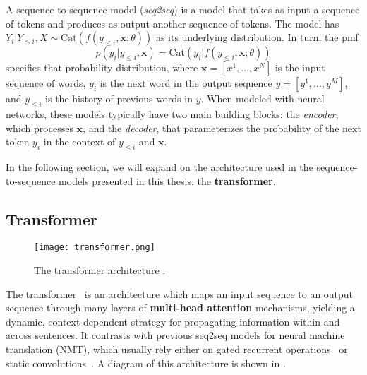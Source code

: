 \begin{definition}
    A sequence-to-sequence model (\textit{seq2seq}) is a model that takes as input a
    sequence of tokens and produces as output another sequence of tokens.
    The model has $Y_i | Y_{\leq i}, X \sim \text{Cat}(f(y_{\leq i}, \bm{x};
        \theta))$ as its underlying distribution. In turn, the pmf
    \begin{equation}
        p(y_i|y_{\leq i}, \bm{x}) = \text{Cat}(y_i|f(y_{\leq i}, \bm{x}; \theta))
    \end{equation}
    specifies that probability distribution, where
    $\bm{x}=[x^1, \dots, x^N]$ is the input sequence of words,
    $y_i$ is the next word in the output sequence $y=[y^1, \dots, y^M]$,
    and $y_{\leq i}$ is the history of previous words in $y$.
    When modeled with neural networks, these models typically have
    two main building blocks: the \textit{encoder}, which processes $\bm{x}$,
    and the \textit{decoder}, that parameterizes the probability of the next
    token $y_i$ in the context of $y_{\leq i}$ and $\bm{x}$.
\end{definition}

In the following section, we will expand on the architecture used in
the sequence-to-sequence models presented in this thesis: the \textbf{transformer}.

\subsection{Transformer}
\label{sec:transformer_bg}

\begin{figure}[t]
    \centering
    \texttt{[image: transformer.png]}
    \caption{The transformer architecture \citep[figure taken from][]{vaswani2017attention}.}
    \label{fig:transformer_architecture}
\end{figure}

\noindent The transformer~\citep{vaswani2017attention} is an architecture which
maps an input sequence to an output sequence through many layers of
\textbf{multi-head attention} mechanisms, yielding a dynamic,
context-dependent strategy for propagating information within and
across sentences. It contrasts with previous seq2seq models for neural machine translation (NMT), which
usually rely either on gated recurrent operations~\citep[often
    LSTMs:][]{bahdanau2014neural,luong2015effective} or static
convolutions~\citep{convseq}. A diagram of this architecture is
shown in .

